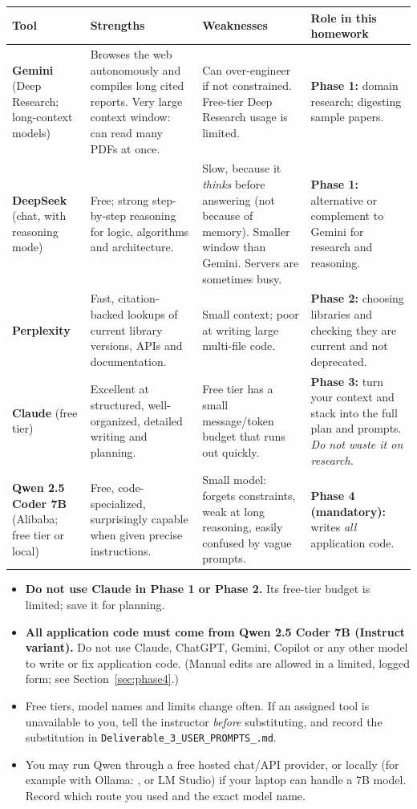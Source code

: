 \documentclass[11pt,a4paper]{article}
\newcommand{\uid}{[HeUserID]}
\newcommand{\dC}{\texttt{Deliverable\_3\_\allowbreak USER\_PROMPTS\_\allowbreak\uid.md}}
\newcommand{\fn}[1]{\texttt{\detokenize{#1}}}
\begin{document}
\begin{tabularx}{\textwidth}{@{}>{\raggedright\arraybackslash}p{2.5cm}LLL@{}}
\toprule
\textbf{Tool} & \textbf{Strengths} & \textbf{Weaknesses} & \textbf{Role in this homework}\\
\midrule
\textbf{Gemini} (Deep Research; long-context models) & Browses the web autonomously and compiles long cited reports. Very large context window: can read many PDFs at once. & Can over-engineer if not constrained. Free-tier Deep Research usage is limited. & \textbf{Phase 1:} domain research; digesting sample papers.\\
\textbf{DeepSeek} (chat, with reasoning mode) & Free; strong step-by-step reasoning for logic, algorithms and architecture. & Slow, because it \emph{thinks} before answering (not because of memory). Smaller window than Gemini. Servers are sometimes busy. & \textbf{Phase 1:} alternative or complement to Gemini for research and reasoning.\\
\textbf{Perplexity} & Fast, citation-backed lookups of current library versions, APIs and documentation. & Small context; poor at writing large multi-file code. & \textbf{Phase 2:} choosing libraries and checking they are current and not deprecated.\\
\textbf{Claude} (free tier) & Excellent at structured, well-organized, detailed writing and planning. & Free tier has a small message/token budget that runs out quickly. & \textbf{Phase 3:} turn your context and stack into the full plan and prompts. \emph{Do not waste it on research.}\\
\textbf{Qwen 2.5 Coder 7B} (Alibaba; free tier or local) & Free, code-specialized, surprisingly capable when given precise instructions. & Small model: forgets constraints, weak at long reasoning, easily confused by vague prompts. & \textbf{Phase 4 (mandatory):} writes \emph{all} application code.\\
\bottomrule
\end{tabularx}

\begin{warnbox}
\begin{itemize}
\item \textbf{Do not use Claude in Phase 1 or Phase 2.} Its free-tier budget is limited; save it for planning.
\item \textbf{All application code must come from Qwen 2.5 Coder 7B (Instruct variant).} Do not use Claude, ChatGPT, Gemini, Copilot or any other model to write or fix application code. (Manual edits are allowed in a limited, logged form; see Section~\ref{sec:phase4}.)
\item Free tiers, model names and limits change often. If an assigned tool is unavailable to you, tell the instructor \emph{before} substituting, and record the substitution in \dC.
\item You may run Qwen through a free hosted chat/API provider, or locally (for example with Ollama: \fn{ollama run qwen2.5-coder:7b}, or LM Studio) if your laptop can handle a 7B model. Record which route you used and the exact model name.
\end{itemize}
\end{warnbox}
\end{document}
